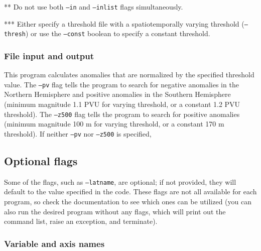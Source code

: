 \documentclass{article}
\begin{document}
** Do not use both \texttt{--in} and \texttt{--inlist} flags simultaneously.

*** Either specify a threshold file with a spatiotemporally varying threshold (\texttt{--thresh}) or use the \texttt{--const} boolean to specify a constant threshold.

\subsubsection{File input and output}
This program calculates anomalies that are normalized by the specified threshold value. The \texttt{--pv} flag tells the program to search for negative anomalies in the Northern Hemisphere and positive anomalies in the Southern Hemisphere (minimum magnitude 1.1 PVU for varying threshold, or a constant 1.2 PVU threshold). The \texttt{--z500} flag tells the program to search for positive anomalies (minimum magnitude 100 m for varying threshold, or a constant 170 m threshold). If neither \texttt{--pv} nor \texttt{--z500} is specified, 

\subsection{Optional flags}\label{option}

Some of the flags, such as \texttt{--latname}, are optional; if not provided, they will default to the value specified in the code. These flags are not all available for each program, so check the documentation to see which ones can be utilized (you can also run the desired program without any flags, which will print out the command list, raise an exception, and terminate).

\subsubsection{Variable and axis names}
\end{document}
